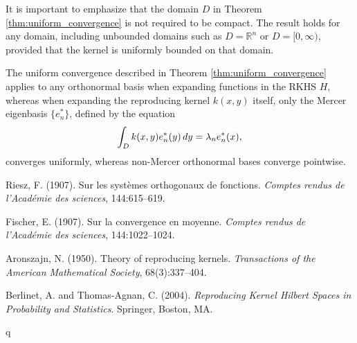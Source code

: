 \documentclass{article}
\newcommand{\tmem}[1]{{\em #1\/}}
\begin{document}
\begin{remark}
  It is important to emphasize that the domain $D$ in Theorem
  \ref{thm:uniform_convergence} is not required to be compact. The result
  holds for any domain, including unbounded domains such as $D =\mathbb{R}^n$
  or $D = [0, \infty)$, provided that the kernel is uniformly bounded on that
  domain.
\end{remark}

\begin{remark}
  \label{rem:mercer_uniqueness}The uniform convergence described in Theorem
  \ref{thm:uniform_convergence} applies to any orthonormal basis when
  expanding functions in the RKHS $H$, whereas when expanding the reproducing
  kernel $k (x, y)$ itself, only the Mercer eigenbasis $\{e_n^{\ast} \}$,
  defined by the equation
  \[ \int_D k (x, y) e_n^{\ast} (y)  \hspace{0.17em} dy = \lambda_n e_n^{\ast}
     (x), \]
  converges uniformly, whereas non-Mercer orthonormal bases converge
  pointwise.
\end{remark}

\begin{thebibliography}{9}
  {} Riesz, F. (1907). Sur les
  syst{\`e}mes orthogonaux de fonctions. {\tmem{Comptes rendus de
  l'Acad{\'e}mie des sciences}}, 144:615--619.
  
  {} Fischer, E. (1907). Sur la
  convergence en moyenne. {\tmem{Comptes rendus de l'Acad{\'e}mie des
  sciences}}, 144:1022--1024.
  
  {} Aronszajn, N. (1950).
  Theory of reproducing kernels. {\tmem{Transactions of the American
  Mathematical Society}}, 68(3):337--404.
  
  {} Berlinet,
  A. and Thomas-Agnan, C. (2004). {\tmem{Reproducing Kernel Hilbert Spaces in
  Probability and Statistics}}. Springer, Boston, MA.
\end{thebibliography}

q
\end{document}
